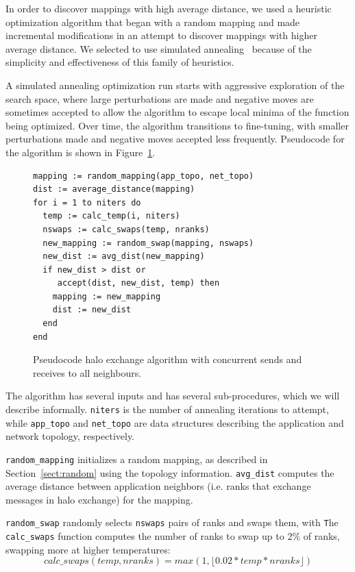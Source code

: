\documentclass{acm_proc_article-sp}
\begin{document}
In order to discover mappings with high average distance, we used
a heuristic optimization algorithm that began with a random mapping
and made incremental modifications in an attempt to discover mappings
with higher average distance.
We selected to use simulated annealing~\cite{Press2007} because of the
simplicity and effectiveness of this family of heuristics.

A simulated annealing optimization run starts with aggressive exploration
of the search space, where large perturbations are made and negative
moves are sometimes accepted to allow the algorithm to escape local
minima of the function being optimized.  Over time, the algorithm
transitions to fine-tuning, with smaller perturbations made and negative moves
accepted less frequently.  Pseudocode for the algorithm is shown in
Figure~\ref{fig:anneal_pseudocode}.

\begin{figure}
  {\footnotesize
  \begin{lstlisting}[frame=lines, basicstyle=\ttfamily,columns=fixed]
mapping := random_mapping(app_topo, net_topo)
dist := average_distance(mapping)
for i = 1 to niters do
  temp := calc_temp(i, niters)
  nswaps := calc_swaps(temp, nranks)
  new_mapping := random_swap(mapping, nswaps)
  new_dist := avg_dist(new_mapping)
  if new_dist > dist or
     accept(dist, new_dist, temp) then
    mapping := new_mapping
    dist := new_dist
  end
end
  \end{lstlisting}
  }
  \caption{Pseudocode halo exchange algorithm with concurrent sends and
           receives to all neighbours.}
    \label{fig:anneal_pseudocode}
\end{figure}

The algorithm has several inputs and has several sub-procedures,
which we will describe informally.
\texttt{niters} is the number of annealing iterations to attempt, while
\texttt{app\_topo} and \texttt{net\_topo} are data structures
describing the application and network topology, respectively.

\texttt{random\_mapping} initializes a random mapping, as described
in Section~\ref{sect:random} using the topology information.
\texttt{avg\_dist} computes the average distance between
application neighbors (i.e. ranks that exchange messages in
halo exchange) for the mapping.

\texttt{random\_swap} randomly selects \texttt{nswaps} pairs of ranks
and swaps them, with \texttt  The \texttt{calc\_swaps} function computes
the number of ranks to swap up to 2\% of ranks, swapping more at higher
temperatures:
$$calc\_swaps(temp, nranks) = max(1, \lfloor 0.02 * temp * nranks \rfloor)$$
\end{document}
